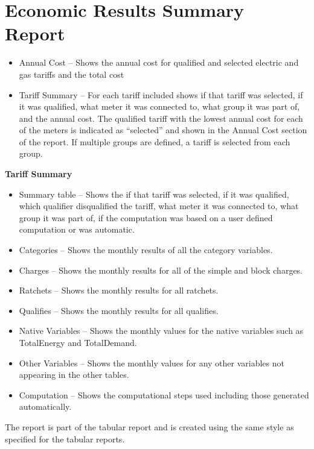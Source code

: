 \section{Economic Results Summary Report}\label{economic-results-summary-report}

\begin{itemize}
\item
  Annual Cost -- Shows the annual cost for qualified and selected electric and gas tariffs and the total cost
\item
  Tariff Summary -- For each tariff included shows if that tariff was selected, if it was qualified, what meter it was connected to, what group it was part of, and the annual cost. The qualified tariff with the lowest annual cost for each of the meters is indicated as ``selected'' and shown in the Annual Cost section of the report. If multiple groups are defined, a tariff is selected from each group.
\end{itemize}

\textbf{Tariff Summary}

\begin{itemize}
\item
  Summary table -- Shows the if that tariff was selected, if it was qualified, which qualifier disqualified the tariff, what meter it was connected to, what group it was part of, if the computation was based on a user defined computation or was automatic.
\item
  Categories -- Shows the monthly results of all the category variables.
\item
  Charges -- Shows the monthly results for all of the simple and block charges.
\item
  Ratchets -- Shows the monthly results for all ratchets.
\item
  Qualifies -- Shows the monthly results for all qualifies.
\item
  Native Variables -- Shows the monthly values for the native variables such as TotalEnergy and TotalDemand.
\item
  Other Variables -- Shows the monthly values for any other variables not appearing in the other tables.
\item
  Computation -- Shows the computational steps used including those generated automatically.
\end{itemize}

The report is part of the tabular report and is created using the same style as specified for the tabular reports.